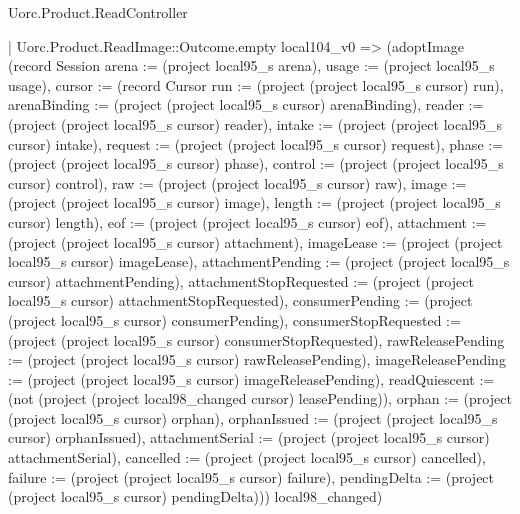 \begin{lexlean}{Uorc.Product.ReadController}
\begin{semanticmodule}
{      | Uorc.Product.ReadImage::Outcome.empty local104_v0 => (adoptImage (record Session {arena := (project local95_s arena), usage := (project local95_s usage), cursor := (record Cursor {run := (project (project local95_s cursor) run), arenaBinding := (project (project local95_s cursor) arenaBinding), reader := (project (project local95_s cursor) reader), intake := (project (project local95_s cursor) intake), request := (project (project local95_s cursor) request), phase := (project (project local95_s cursor) phase), control := (project (project local95_s cursor) control), raw := (project (project local95_s cursor) raw), image := (project (project local95_s cursor) image), length := (project (project local95_s cursor) length), eof := (project (project local95_s cursor) eof), attachment := (project (project local95_s cursor) attachment), imageLease := (project (project local95_s cursor) imageLease), attachmentPending := (project (project local95_s cursor) attachmentPending), attachmentStopRequested := (project (project local95_s cursor) attachmentStopRequested), consumerPending := (project (project local95_s cursor) consumerPending), consumerStopRequested := (project (project local95_s cursor) consumerStopRequested), rawReleasePending := (project (project local95_s cursor) rawReleasePending), imageReleasePending := (project (project local95_s cursor) imageReleasePending), readQuiescent := (not (project (project local98_changed cursor) leasePending)), orphan := (project (project local95_s cursor) orphan), orphanIssued := (project (project local95_s cursor) orphanIssued), attachmentSerial := (project (project local95_s cursor) attachmentSerial), cancelled := (project (project local95_s cursor) cancelled), failure := (project (project local95_s cursor) failure), pendingDelta := (project (project local95_s cursor) pendingDelta)})}) local98_changed)
}
\end{semanticmodule}
\end{lexlean}
